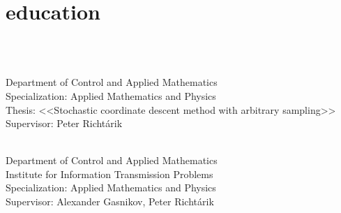 \documentclass[]{deedy-resume-openfont}
\begin{document}
\begin{minipage}[t]{0.66\textwidth} 

\section{education}
\\
\begin{tightemize}
	\item
{}\\
Department of Control and Applied Mathematics\\
Specialization: Applied Mathematics and Physics\\
Thesis: <<Stochastic coordinate descent method with arbitrary sampling>>\\
\normalsize Supervisor: Peter Richt{\'a}rik\\
\vspace{0.1em}
\item
{}\\
Department of Control and Applied Mathematics\\
Institute for Information Transmission Problems\\
Specialization: Applied Mathematics and Physics\\
\normalsize Supervisor:  Alexander Gasnikov, Peter Richt{\'a}rik \\
\end{tightemize}
\vspace{0.1em}

\end{minipage}
\end{document}
